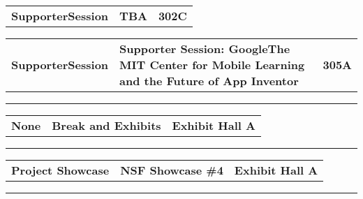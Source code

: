 \begin{longtable}[l]{@{}p{1in}@{}p{3in}@{}r}
    {\sffamily\large\textbf{SupporterSession}} & 
    {\sffamily\large\textbf{TBA}} & 
    {\sffamily\large\textbf{302C}} \\
\end{longtable}    
\begin{longtable}[l]{@{}p{1in}@{}p{3in}@{}r}
    {\sffamily\large\textbf{SupporterSession}} & 
    {\sffamily\large\textbf{Supporter Session: GoogleThe MIT Center for Mobile Learning and the Future of App Inventor}} & 
    {\sffamily\large\textbf{305A}} \\
\end{longtable}    
\vspace{0.5em}
\noindent\rule{5in}{0.02cm}
\vspace{0.5em}
\noindent
{}
\begin{longtable}[l]{@{}p{1in}@{}p{3in}@{}r}
    {\sffamily\large\textbf{None}} & 
    {\sffamily\large\textbf{Break and Exhibits}} & 
    {\sffamily\large\textbf{Exhibit Hall A}} \\
\end{longtable}    
\vspace{0.5em}
\noindent\rule{5in}{0.02cm}
\vspace{0.5em}
\noindent
{}
\begin{longtable}[l]{@{}p{1in}@{}p{3in}@{}r}
    {\sffamily\large\textbf{Project Showcase}} & 
    {\sffamily\large\textbf{NSF Showcase \#4}} & 
    {\sffamily\large\textbf{Exhibit Hall A}} \\
\end{longtable}    
\vspace{0.5em}
\noindent\rule{5in}{0.02cm}
\vspace{0.5em}
\noindent
{}
\newpage
